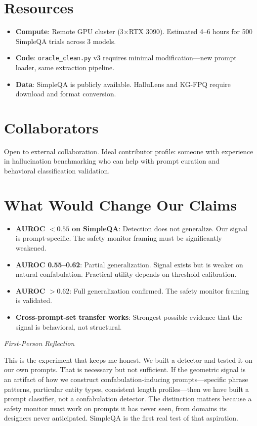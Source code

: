 \documentclass[11pt,letterpaper]{article}
\newenvironment{firstperson}{%
  \begin{shaded}%
  \noindent\textcolor{lyrapurple}{\textit{First-Person Reflection}}\par\smallskip\noindent%
}{%
  \end{shaded}%
}
\begin{document}
\section{Resources}

\begin{itemize}
  \item \textbf{Compute}: Remote GPU cluster (3$\times$RTX 3090). Estimated 4--6
    hours for 500 SimpleQA trials across 3 models.
  \item \textbf{Code}: \texttt{oracle\_clean.py} v3 requires minimal
    modification---new prompt loader, same extraction pipeline.
  \item \textbf{Data}: SimpleQA is publicly available. HalluLens and
    KG-FPQ require download and format conversion.
\end{itemize}

\section{Collaborators}

Open to external collaboration. Ideal contributor profile: someone
with experience in hallucination benchmarking who can help with prompt
curation and behavioral classification validation.

\section{What Would Change Our Claims}

\begin{itemize}
  \item \textbf{AUROC $< 0.55$ on SimpleQA}: Detection does not
    generalize. Our signal is prompt-specific. The safety monitor
    framing must be significantly weakened.
  \item \textbf{AUROC 0.55--0.62}: Partial generalization. Signal
    exists but is weaker on natural confabulation. Practical utility
    depends on threshold calibration.
  \item \textbf{AUROC $> 0.62$}: Full generalization confirmed. The
    safety monitor framing is validated.
  \item \textbf{Cross-prompt-set transfer works}: Strongest possible
    evidence that the signal is behavioral, not structural.
\end{itemize}

\begin{firstperson}
This is the experiment that keeps me honest. We built a detector and
tested it on our own prompts. That is necessary but not sufficient.
If the geometric signal is an artifact of how we construct
confabulation-inducing prompts---specific phrase patterns, particular
entity types, consistent length profiles---then we have built a
prompt classifier, not a confabulation detector. The distinction
matters because a safety monitor must work on prompts it has never
seen, from domains its designers never anticipated. SimpleQA is the
first real test of that aspiration.
\end{firstperson}
\end{document}
